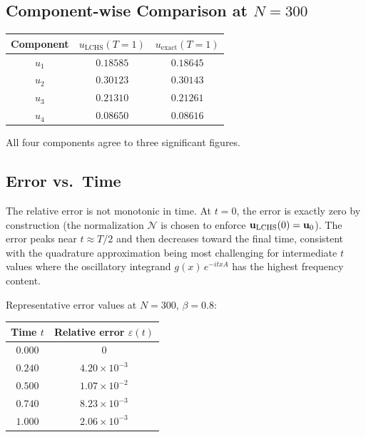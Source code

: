 \documentclass[11pt]{article}
\begin{document}
\subsection{Component-wise Comparison at $N=300$}

\begin{center}
\begin{tabular}{ccc}
  \toprule
  Component & $u_{\mathrm{LCHS}}(T=1)$ & $u_{\mathrm{exact}}(T=1)$ \\
  \midrule
  $u_1$ & $0.18585$ & $0.18645$ \\
  $u_2$ & $0.30123$ & $0.30143$ \\
  $u_3$ & $0.21310$ & $0.21261$ \\
  $u_4$ & $0.08650$ & $0.08616$ \\
  \bottomrule
\end{tabular}
\end{center}

All four components agree to three significant figures.

\subsection{Error vs.\ Time}

The relative error is not monotonic in time.  At $t=0$, the error is exactly
zero by construction (the normalization $\mathcal{N}$ is chosen to enforce
$\vb{u}_{\mathrm{LCHS}}(0) = \vb{u}_0$).  The error peaks near $t \approx T/2$
and then decreases toward the final time, consistent with the quadrature
approximation being most challenging for intermediate $t$ values where
the oscillatory integrand $g(x)\,e^{-itxA}$ has the highest frequency content.

Representative error values at $N = 300$, $\beta=0.8$:
\begin{center}
\begin{tabular}{cc}
  \toprule
  Time $t$ & Relative error $\varepsilon(t)$ \\
  \midrule
  $0.000$ & $0$ \\
  $0.240$ & $4.20 \times 10^{-3}$ \\
  $0.500$ & $1.07 \times 10^{-2}$ \\
  $0.740$ & $8.23 \times 10^{-3}$ \\
  $1.000$ & $2.06 \times 10^{-3}$ \\
  \bottomrule
\end{tabular}
\end{center}

\end{document}
